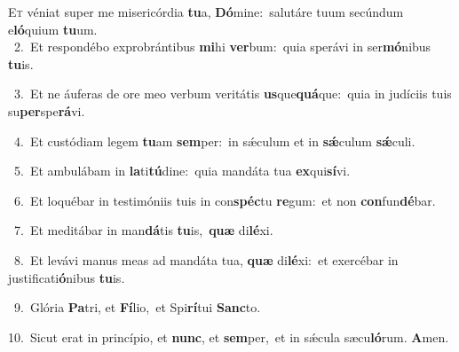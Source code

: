 \lettrine{\initial\textcolor{\initialcolor}{E}}{t} véniat super me misericórdia \textbf{tu}\-a, \textbf{Dó}\-mine:~\star salutáre tuum secúndum e\-\textbf{ló}\-quium \textbf{tu}\-um.\\
{\numbfont\textcolor{\numbcolor}{~2.}}~Et respondébo exprobrántibus \textbf{mi}\-hi \textbf{ver}\-bum:~\star quia sperávi in ser\-\textbf{mó}\-nibus \textbf{tu}\-is.\par
{\numbfont\textcolor{\numbcolor}{~3.}}~Et ne áuferas de ore meo verbum veritátis \textbf{us}\-que\-\textbf{quá}\-que:~\star quia in judíciis tuis su\-\textbf{per}\-spe\-\textbf{rá}\-vi.\par
{\numbfont\textcolor{\numbcolor}{~4.}}~Et custódiam legem \textbf{tu}\-am \textbf{sem}\-per:~\star in sǽculum et in \textbf{sǽ}\-culum \textbf{sǽ}\-culi.\par
{\numbfont\textcolor{\numbcolor}{~5.}}~Et ambulábam in \textbf{la}\-ti\-\textbf{tú}\-dine:~\star quia mandáta tua \textbf{ex}\-qui\-\textbf{sí}\-vi.\par
{\numbfont\textcolor{\numbcolor}{~6.}}~Et loquébar in testimóniis tuis in con\-\textbf{spéc}\-tu \textbf{re}\-gum:~\star et non \textbf{con}\-fun\-\textbf{dé}\-bar.\par
{\numbfont\textcolor{\numbcolor}{~7.}}~Et meditábar in man\-\textbf{dá}\-tis \textbf{tu}\-is,~\star \textbf{quæ} di\-\textbf{lé}\-xi.\par
{\numbfont\textcolor{\numbcolor}{~8.}}~Et levávi manus meas ad mandáta tua, \textbf{quæ} di\-\textbf{lé}\-xi:~\star et exercébar in justificati\-\textbf{ó}\-nibus \textbf{tu}\-is.\par
{\numbfont\textcolor{\numbcolor}{~9.}}~Glória \textbf{Pa}\-tri, et \textbf{Fí}\-lio,~\star et Spi\-\textbf{rí}\-tui \textbf{Sanc}\-to.\par
{\numbfont\textcolor{\numbcolor}{10.}}~Sicut erat in princípio, et \textbf{nunc}\-, et \textbf{sem}\-per,~\star et in sǽcula sæcu\-\textbf{ló}\-rum. \textbf{A}\-men.\par
